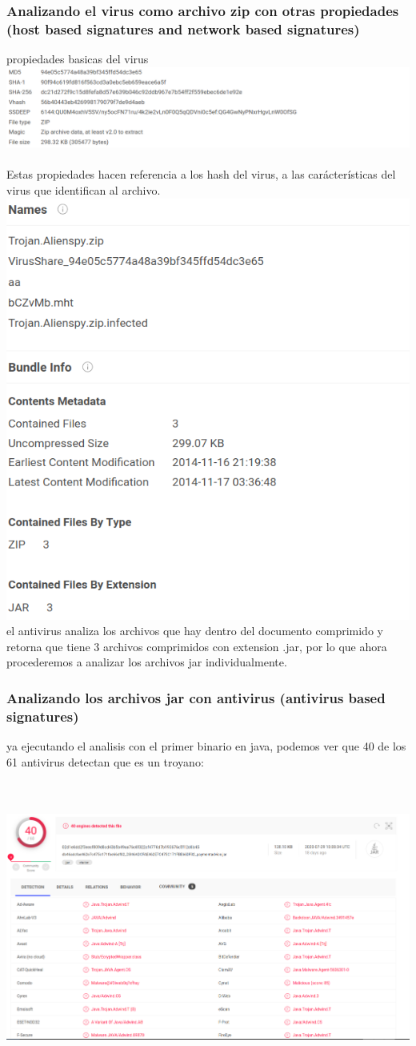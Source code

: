 \documentclass[10pt,a4paper]{article} %
\begin{document}
                \subsubsection{Analizando el virus como archivo zip con otras propiedades (host
                based signatures and network based signatures)}
                    propiedades basicas del virus 
                    \\ \includegraphics[width=0.5\linewidth]{propiedadesbasicas.png}
                    \\ 
                    \\ Estas propiedades hacen referencia a los hash del virus,
                    a las carácterísticas del virus que identifican al archivo.
                    \includegraphics[width=0.5\linewidth]{otraspropiedades.png}
                    \\ 
                    el antivirus analiza los archivos que hay dentro del
                    documento comprimido y retorna que tiene 3 archivos
                    comprimidos con extension .jar, por lo que ahora
                    procederemos a analizar los archivos jar individualmente.

                \subsubsection{Analizando los archivos jar con antivirus
                (antivirus based signatures)}
                    ya ejecutando el analisis con el primer binario en java, podemos
                    ver que 40 de los 61 antivirus detectan que es un troyano: 

                    \\ 
                    \\ \includegraphics[width=0.5\linewidth]{payment.png}
\end{document}
